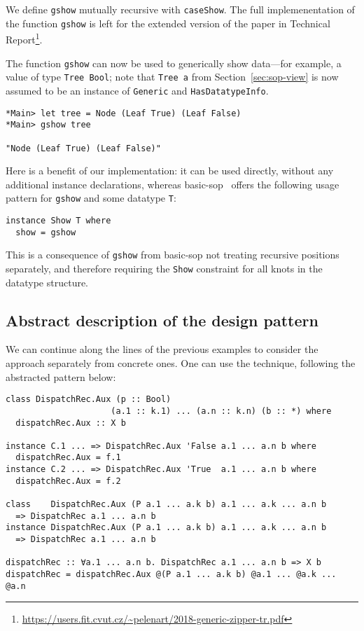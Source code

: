 \documentclass[runningheads]{llncs}
\newcommand{\K}[1]{\lstinline[style=fancy]{#1}}
\begin{document}
We define \K{gshow} mutually recursive with \K{caseShow}. The full implemenentation of the function \K{gshow} is left for the extended version of the paper in Technical Report\footnote{\url{https://users.fit.cvut.cz/~pelenart/2018-generic-zipper-tr.pdf}}.

The function \K{gshow} can now be used to generically show data---for example, a value of type \K{Tree Bool}; note that \K{Tree a} from Section~\ref{sec:sop-view} is now assumed to be an instance of \K{Generic} and \K{HasDatatypeInfo}.
\begin{lstlisting}[style=ttstyle]
*Main> let tree = Node (Leaf True) (Leaf False)
*Main> gshow tree

"Node (Leaf True) (Leaf False)"
\end{lstlisting}
Here is a benefit of our implementation: it can be used directly, without any additional instance declarations, whereas \textsf{basic-sop}~\cite{basic-sop} offers the following usage pattern for \K{gshow} and some datatype \K{T}:
\begin{lstlisting}[style=fancy]
instance Show T where
  show = gshow
\end{lstlisting}
This is a consequence of \K{gshow} from \textsf{basic-sop} not treating recursive positions separately, and therefore requiring the \K{Show} constraint for all knots in the datatype structure.


\subsection{Abstract description of the design pattern}
\label{subsec:abstract-pattern}


We can continue along the lines of the previous examples to consider the approach separately from concrete ones. One can use the technique, following the abstracted pattern below:

\begin{lstlisting}[style=fancy]
class DispatchRec.Aux (p :: Bool)
                     (a.1 :: k.1) ... (a.n :: k.n) (b :: *) where
  dispatchRec.Aux :: X b

instance C.1 ... => DispatchRec.Aux 'False a.1 ... a.n b where
  dispatchRec.Aux = f.1
instance C.2 ... => DispatchRec.Aux 'True  a.1 ... a.n b where
  dispatchRec.Aux = f.2

class    DispatchRec.Aux (P a.1 ... a.k b) a.1 ... a.k ... a.n b
  => DispatchRec a.1 ... a.n b
instance DispatchRec.Aux (P a.1 ... a.k b) a.1 ... a.k ... a.n b
  => DispatchRec a.1 ... a.n b

dispatchRec :: ∀a.1 ... a.n b. DispatchRec a.1 ... a.n b => X b
dispatchRec = dispatchRec.Aux @(P a.1 ... a.k b) @a.1 ... @a.k ... @a.n
\end{lstlisting}
\end{document}
